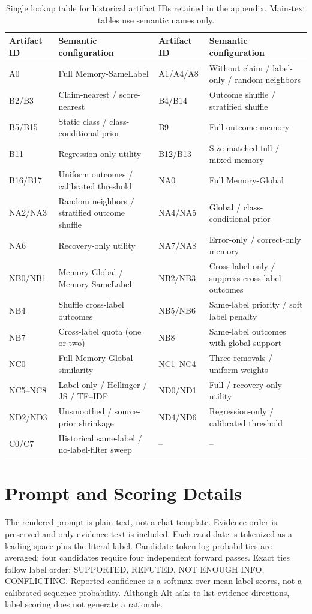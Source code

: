 \documentclass[runningheads]{llncs}
\begin{document}
\begin{table}[t]
\caption{Single lookup table for historical artifact IDs retained in the
appendix. Main-text tables use semantic names only.}
\label{tab:artifact-id-map}
\centering\scriptsize
\begin{tabular}{llll}
\toprule
Artifact ID & Semantic configuration & Artifact ID & Semantic configuration \\
\midrule
A0 & Full Memory-SameLabel & A1/A4/A8 & Without claim / label-only / random neighbors \\
B2/B3 & Claim-nearest / score-nearest & B4/B14 & Outcome shuffle / stratified shuffle \\
B5/B15 & Static class / class-conditional prior & B9 & Full outcome memory \\
B11 & Regression-only utility & B12/B13 & Size-matched full / mixed memory \\
B16/B17 & Uniform outcomes / calibrated threshold & NA0 & Full Memory-Global \\
NA2/NA3 & Random neighbors / stratified outcome shuffle & NA4/NA5 & Global / class-conditional prior \\
NA6 & Recovery-only utility & NA7/NA8 & Error-only / correct-only memory \\
NB0/NB1 & Memory-Global / Memory-SameLabel & NB2/NB3 & Cross-label only / suppress cross-label outcomes \\
NB4 & Shuffle cross-label outcomes & NB5/NB6 & Same-label priority / soft label penalty \\
NB7 & Cross-label quota (one or two) & NB8 & Same-label outcomes with global support \\
NC0 & Full Memory-Global similarity & NC1--NC4 & Three removals / uniform weights \\
NC5--NC8 & Label-only / Hellinger / JS / TF--IDF & ND0/ND1 & Full / recovery-only utility \\
ND2/ND3 & Unsmoothed / source-prior shrinkage & ND4/ND6 & Regression-only / calibrated threshold \\
C0/C7 & Historical same-label / no-label-filter sweep & -- & -- \\
\bottomrule
\end{tabular}
\end{table}

\section{Prompt and Scoring Details}
The rendered prompt is plain text, not a chat template. Evidence order is
preserved and only evidence text is included. Each candidate is tokenized as a
leading space plus the literal label. Candidate-token log probabilities are
averaged; four candidates require four independent forward passes. Exact ties
follow label order: SUPPORTED, REFUTED, NOT ENOUGH INFO, CONFLICTING. Reported
confidence is a softmax over mean label scores, not a calibrated sequence
probability. Although Alt asks to list evidence directions, label scoring does
not generate a rationale.
\end{document}
